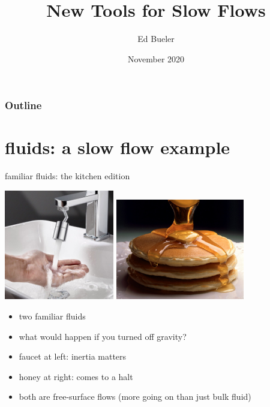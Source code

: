 \documentclass[10pt,hyperref,dvipsnames]{beamer}
\title{New Tools for Slow Flows}
\author{Ed Bueler}
\institute[UAF]{University of Alaska Fairbanks}
\date{November 2020}
\begin{document}
\beamertemplatenavigationsymbolsempty

\begin{frame}
  \maketitle
\end{frame}

\begin{frame}
  \frametitle{Outline}
  \tableofcontents[hideallsubsections]
\end{frame}


\section{fluids: a slow flow example}

\begin{frame}{familiar fluids: the kitchen edition}

\begin{center}
\includegraphics[width=0.36\textwidth]{figs/faucet.jpg} \hfill \includegraphics[width=0.42\textwidth]{figs/pancakes.jpg}
\end{center}

\begin{itemize}
\item two familiar fluids
\item what would happen if you turned off gravity?
\item \alert{faucet at left}: inertia matters
\item \alert{honey at right}: comes to a halt
\item both are free-surface flows (more going on than just bulk fluid)
\end{itemize}
\end{frame}
\end{document}

